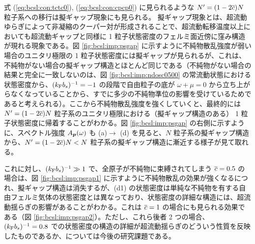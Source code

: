 式 (\ref{eq:bcsl:con:tctc0}), (\ref{eq:bcsl:con:cpcp0}) に見られるような $N'=(1-2\overline{c})N$ 粒子系への移行は擬ギャップ現象にも見られる。
擬ギャップ現象とは、超流動ゆらぎによって非凝縮のクーパー対が形成されることで、超流動転移温度以上においても超流動ギャップと同様に 1 粒子状態密度のフェルミ面近傍に窪み構造が現れる現象である。図 \ref{fig:bcsl:imp:psgap} に示すように不純物散乱強度が弱い場合のユニタリ極限の 1 粒子状態密度には擬ギャップが見られるが、これは、不純物がない場合の擬ギャップ構造とほとんど同じである（不純物がない場合の結果と完全に一致しないのは、図 \ref{fig:bcsl:imp:ndosc0500} の常流動状態における状態密度から、$(k_{\text{F}} b_s)^{-1}=-1$ の段階で自由粒子の底が $\omega+\mu=0$ から立ち上がらなくなっていることから、すでに多少の不純物準位の影響を受けているためであると考えられる）。ここから不純物散乱強度を強くしていくと、最終的には $N'=(1-2\overline{c})N$ 粒子系のユニタリ極限における（擬ギャップ構造のある） 1 粒子状態密度に帰着することがわかる。図 \ref{fig:bcsl:imp:psgap} の右側に示すように、スペクトル強度 $A_{\bm{p}}(\omega)$ も (a)$\to$ (d) を見ると、$N$ 粒子系の擬ギャップ構造から、$N'=(1-2\overline{c})N<N $ 粒子系の擬ギャップ構造に漸近する様子が見て取れる。

これに対し、$(k_{\text{F}} b_s)^{-1}\gg1$ で、全原子が不純物に束縛されてしまう $\overline{c}=0.5$ の場合は、図 \ref{fig:bcsl:imp:psgap1} に示すように不純物散乱の効果が強くなるにつれ、擬ギャップ構造は消失するが、(d1) の状態密度は単純な不純物を有する自由フェルミ気体の状態密度とは異なっており、状態密度の詳細な構造には、超流動揺らぎの影響があることがわかる。これは $\overline{c}=1$ の場合にも見られる効果である（図 \ref{fig:bcsl:imp:psgap2}）。ただし、これら後者 2 つの場合、$(k_{\text{F}} b_s)^{-1}=0.8$ での状態密度の構造の詳細が超流動揺らぎのどういう性質を反映したものであるか、については今後の研究課題である。


